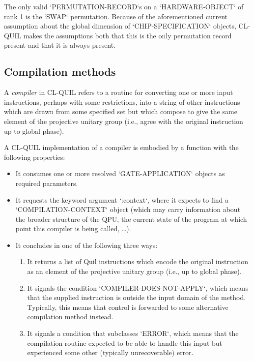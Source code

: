 \begin{remark}
The only valid `PERMUTATION-RECORD`s on a `HARDWARE-OBJECT` of rank 1 is the `SWAP` permutation.  Because of the aforementioned current assumption about the global dimension of `CHIP-SPECIFICATION` objects, CL-QUIL makes the assumptions both that this is the only permutation record present and that it is always present.
\end{remark}


\subsection{Compilation methods}\label{CompilationMethods}

A \textit{compiler} in CL-QUIL refers to a routine for converting one or more input instructions, perhaps with some restrictions, into a string of other instructions which are drawn from some specified set but which compose to give the same element of the projective unitary group (i.e., agree with the original instruction up to global phase).

A CL-QUIL implementation of a compiler is embodied by a function with the following properties:

\begin{itemize}
	\item It consumes one or more resolved `GATE-APPLICATION` objects as required parameters.
  \item It requests the keyword argument `:context`, where it expects to find a `COMPILATION-CONTEXT` object (which may carry information about the broader structure of the QPU, the current state of the program at which point this compiler is being called, \ldots).
	\item It concludes in one of the following three ways:
	\begin{enumerate}
		\item It returns a list of Quil instructions which encode the original instruction as an element of the projective unitary group (i.e., up to global phase).
		\item It signals the condition `COMPILER-DOES-NOT-APPLY`, which means that the supplied instruction is outside the input domain of the method.  Typically, this means that control is forwarded to some alternative compilation method instead.
		\item It signals a condition that subclasses `ERROR`, which means that the compilation routine expected to be able to handle this input but experienced some other (typically unrecoverable) error.
	\end{enumerate}
\end{itemize}

